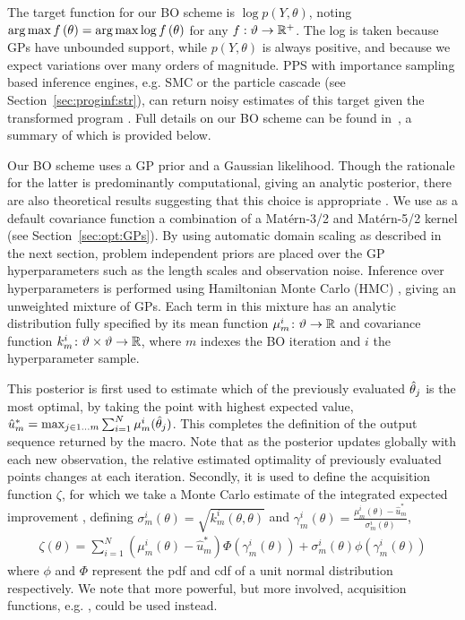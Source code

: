 
The target function for our BO scheme is $\log p(Y,\theta)$, noting $\operatorname*{arg\,max} f\left(\theta\right) = \operatorname*{arg\,max} \log f\left(\theta\right)$ for any $f : \vartheta \rightarrow \mathbb{R}^+$.  The log is taken because GPs have unbounded support, while $p\left(Y,\theta\right)$ is always positive, and because we expect variations over many orders of magnitude.  PPS with importance sampling based inference engines, e.g. SMC or the particle cascade (see Section~\ref{sec:proginf:str}), can return noisy estimates of this target given the transformed program \qmarg.   Full details on our BO scheme can be found
in~\cite{rainforth2017boppArxiv}, a summary of which is provided below.

Our BO scheme uses a GP prior and a Gaussian likelihood.  Though the rationale for the latter is predominantly computational, giving an analytic posterior, there are also theoretical results suggesting that this choice is appropriate \cite{berard2014lognormal}. We use as a default covariance function a combination of a Mat\'{e}rn-3/2 and Mat\'{e}rn-5/2 kernel (see
Section~\ref{sec:opt:GPs}). By using automatic domain scaling as described in the next section, problem independent priors are placed over the GP hyperparameters such as the length scales and observation noise.  Inference over hyperparameters is performed using Hamiltonian Monte Carlo (HMC) \citep{duane1987hybrid}, giving an unweighted mixture of GPs.  Each term in this mixture has an analytic distribution fully specified by its mean function $\mu_m^i \colon \vartheta \rightarrow \mathbb{R}$ and covariance function $k_m^i \colon \vartheta \times \vartheta \rightarrow \mathbb{R}$, where $m$ indexes the BO iteration and $i$ the hyperparameter sample.

This posterior is first used to estimate which of the previously evaluated $\hat{\theta}_j$ is the most optimal, by taking the point with highest expected value, $\hat{u}^*_m = \max_{j\in1\dots m} \sum_{i=1}^{N} \mu_{m}^i (\hat{\theta}_j)$.  This completes the definition of the output sequence returned by the \doopt macro.  Note that as the posterior updates globally with each new observation, the relative estimated optimality of previously evaluated points changes at each iteration.
Secondly, it is used to define the acquisition function $\zeta$, for which we take a Monte Carlo estimate of the integrated expected improvement \cite{snoek2012practical}, defining $\sigma_m^i\left(\theta\right) = \sqrt{k_m^i\left(\theta,\theta\right)}$ and $\gamma_m^i\left(\theta\right) = \frac{\mu_m^i \left(\theta\right)-\hat{u}_m^*}{\sigma_m^i\left(\theta\right)}$,
\begin{align}
\label{eq:exp-imp}
\zeta \left(\theta\right) = \sum_{i=1}^{N} \left(\mu_m^i\left(\theta\right)-\hat{u}_m^*\right)\Phi \left(\gamma_m^i\left(\theta\right)\right)+\sigma_m^i\left(\theta\right)\phi\left(\gamma_m^i\left(\theta\right)\right)
\end{align}
where $\phi$ and $\Phi$ represent the pdf and cdf of a unit normal distribution respectively.   We note that more powerful, but more involved, acquisition functions, e.g. \cite{hernandez2014predictive}, could be used instead.
